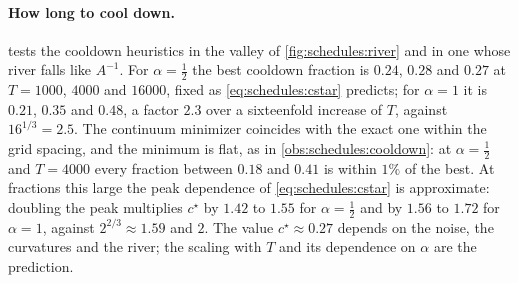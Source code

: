 \begin{refsection}
\begin{figure}[t]
\label{fig:schedules:bound}
\end{figure}

\paragraph{How long to cool down.}  tests the cooldown heuristics in the valley of \cref{fig:schedules:river} and in one whose river falls like $A^{-1}$. For $\alpha=\frac12$ the best cooldown fraction is $0.24$, $0.28$ and $0.27$ at $T=1000$, $4000$ and $16000$, fixed as \eqref{eq:schedules:cstar} predicts; for $\alpha=1$ it is $0.21$, $0.35$ and $0.48$, a factor $2.3$ over a sixteenfold increase of $T$, against $16^{1/3}=2.5$. The continuum minimizer coincides with the exact one within the grid spacing, and the minimum is flat, as in \cref{obs:schedules:cooldown}: at $\alpha=\frac12$ and $T=4000$ every fraction between $0.18$ and $0.41$ is within $1\%$ of the best. At fractions this large the peak dependence of \eqref{eq:schedules:cstar} is approximate: doubling the peak multiplies $c^\star$ by $1.42$ to $1.55$ for $\alpha=\frac12$ and by $1.56$ to $1.72$ for $\alpha=1$, against $2^{2/3}\approx1.59$ and $2$. The value $c^\star\approx0.27$ depends on the noise, the curvatures and the river; the scaling with $T$ and its dependence on $\alpha$ are the prediction.


\end{refsection}

